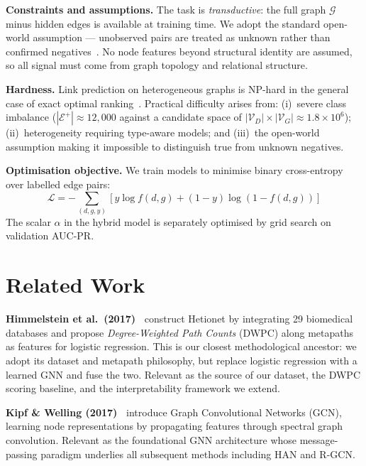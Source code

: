 \documentclass[10pt,a4paper,twocolumn]{article}
\newcommand{\Gcal}{\mathcal{G}}
\newcommand{\Vcal}{\mathcal{V}}
\newcommand{\Ecal}{\mathcal{E}}
\begin{document}
\textbf{Constraints and assumptions.} The task is \textit{transductive}: the
full graph $\Gcal$ minus hidden edges is available at training time. We adopt the
standard open-world assumption --- unobserved pairs are treated as unknown
rather than confirmed negatives~\citep{nickel2016review}. No node features
beyond structural identity are assumed, so all signal must come from graph
topology and relational structure.

\textbf{Hardness.} Link prediction on heterogeneous graphs is NP-hard in the
general case of exact optimal ranking~\citep{liben2007link}. Practical
difficulty arises from: (i)~severe class imbalance ($|\Ecal^+| \approx 12{,}000$
against a candidate space of $|\Vcal_D| \times |\Vcal_G| \approx 1.8 \times
10^6$); (ii)~heterogeneity requiring type-aware models; and (iii)~the
open-world assumption making it impossible to distinguish true from unknown
negatives.

\textbf{Optimisation objective.} We train models to minimise binary
cross-entropy over labelled edge pairs:
\begin{equation}
\mathcal{L} = -\!\!\sum_{(d,g,y)}\!\left[y\log f(d,g)+(1-y)\log(1-f(d,g))\right]
\label{eq:loss}
\end{equation}
The scalar $\alpha$ in the hybrid model is separately optimised by grid search
on validation AUC-PR.

\section{Related Work}
\label{sec:related}

\textbf{Himmelstein et al.\ (2017)~\citep{himmelstein2017}} construct Hetionet
by integrating 29 biomedical databases and propose \textit{Degree-Weighted Path
Counts} (DWPC) along metapaths as features for logistic regression. This is our
closest methodological ancestor: we adopt its dataset and metapath philosophy,
but replace logistic regression with a learned GNN and fuse the two. Relevant
as the source of our dataset, the DWPC scoring baseline, and the interpretability
framework we extend.

\textbf{Kipf \& Welling (2017)~\citep{kipf2017gcn}} introduce Graph
Convolutional Networks (GCN), learning node representations by propagating
features through spectral graph convolution. Relevant as the foundational GNN
architecture whose message-passing paradigm underlies all subsequent methods
including HAN and R-GCN.
\end{document}
